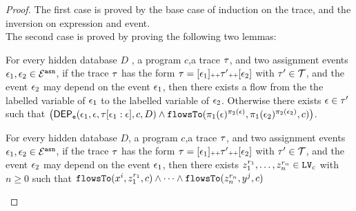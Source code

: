 {\begin{proof}
%
The first case is proved by the base case of induction on the trace, and the inversion on expression and event.
\\
The second case is proved by proving the following two lemmas:
\begin{lem}
  \label{lem:depevents_exist}
For every hidden database $D$ , a program $c$,a trace $\mathtt{\tau}$, and two assignment events 
$\mathtt{\epsilon}_1, \mathtt{\epsilon}_2 \in \mathcal{E}^{\mathtt{{asn}}}$,
if the trace $\mathtt{\tau}$ has the form $\mathtt{\tau} = [\mathtt{\epsilon}_1] {\scriptscriptstyle ++} \mathtt{\tau}' {\scriptscriptstyle ++} [\mathtt{\epsilon}_2]$ with $\mathtt{\tau}' \in \mathcal{T}$, 
and the event $\mathtt{\epsilon}_2$ may depend on the event $\mathtt{\epsilon}_1$, 
then there exists a flow from the the labelled variable of $\mathtt{\epsilon}_1$ to 
the labelled variable of $\mathtt{\epsilon}_2$.  
 Otherwise there exists
$\mathtt{\epsilon} \in \mathtt{\tau}'$ such that
$\left( 		
    \eventdep(\event_1, \event, \trace[\event_1:\event], c, D)
\land 
\flowsto(\pi_1(\event)^{\pi_2(\event)}, \pi_1(\event_2)^{\pi_2(\event_2)}, c) 
\right)$.
%
\end{lem}
\begin{thm}
  \label{thm:flowsto_event_soundness}
  For every hidden database $D$, a program $c$,a trace $\mathtt{\tau}$, and two assignment events 
$\mathtt{\epsilon}_1, \mathtt{\epsilon}_2 \in \mathcal{E}^{\mathtt{{asn}}}$, 
if the trace $\mathtt{\tau}$ has the form $\mathtt{\tau} = [\mathtt{\epsilon}_1] {\scriptscriptstyle ++} \mathtt{\tau}' {\scriptscriptstyle ++} [\mathtt{\epsilon}_2]$ with $\mathtt{\tau}' \in \mathcal{T}$, 
and the event $\mathtt{\epsilon}_2$ may depend on the event $\mathtt{\epsilon}_1$,  then there exists
    $z_1^{r_1}, \ldots, z_n^{r_n} \in \mathtt{LV}_{{c}}$ with $n \geq 0$ such that   
  $\mathtt{flowsTo}(x^i,  z_1^{r_1}, c) 
  \land \cdots \land \mathtt{flowsTo}(z_n^{r_n}, y^j, c)$

\end{thm}
\end{proof}}

